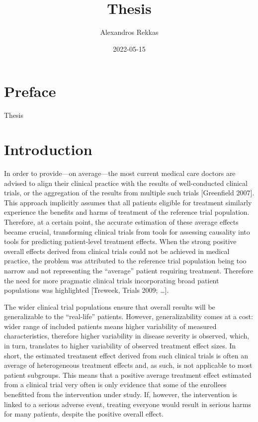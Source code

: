 \documentclass[
]{book}
\title{Thesis}
\author{Alexandros Rekkas}
\date{2022-05-15}
\begin{document}
\maketitle

{
\setcounter{tocdepth}{1}
\tableofcontents
}
\hypertarget{preface}{%
\chapter*{Preface}\label{preface}}

Thesis

\hypertarget{introduction}{%
\chapter*{Introduction}\label{introduction}}

In order to provide---on average---the most current medical care doctors are
advised to align their clinical practice with the results of well-conducted
clinical trials, or the aggregation of the results from multiple such trials
{[}Greenfield 2007{]}. This approach implicitly assumes that all patients eligible
for treatment similarly experience the benefits and harms of treatment of the
reference trial population. Therefore, at a certain point, the accurate
estimation of these average effects became crucial, transforming clinical trials
from tools for assessing causality into tools for predicting patient-level
treatment effects. When the strong positive overall effects derived from
clinical trials could not be achieved in medical practice, the problem was
attributed to the reference trial population being too narrow and not
representing the ``average'' patient requiring treatment. Therefore the need for
more pragmatic clinical trials incorporating broad patient populations was
highlighted {[}Treweek, Trials 2009; \ldots{]}.

The wider clinical trial populations ensure that overall results will be
generalizable to the ``real-life'' patients. However, generalizability comes at a
cost: wider range of included patients means higher variability of measured
characteristics, therefore higher variability in disease severity is observed,
which, in turn, translates to higher variability of observed treatment effect
sizes. In short, the estimated treatment effect derived from such clinical
trials is often an average of heterogeneous treatment effects and, as such, is
not applicable to most patient subgroups. This means that a positive average
treatment effect estimated from a clinical trial very often is only evidence
that some of the enrollees benefitted from the intervention under study. If,
however, the intervention is linked to a serious adverse event, treating
everyone would result in serious harms for many patients, despite the positive
overall effect.
\end{document}
